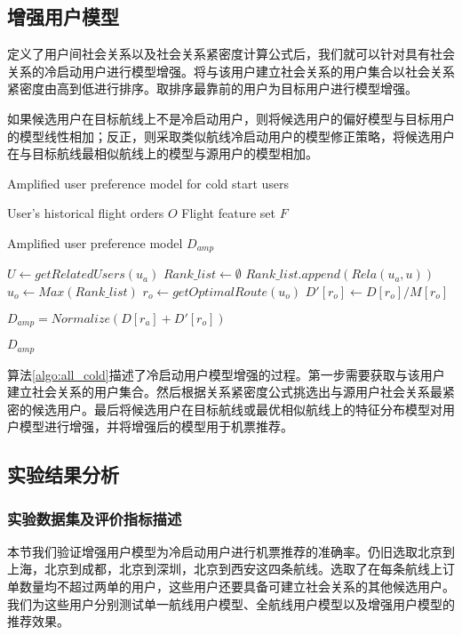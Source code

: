 \subsection{增强用户模型}

定义了用户间社会关系以及社会关系紧密度计算公式后，我们就可以针对具有社会关系的冷启动用户进行模型增强。将与该用户建立社会关系的用户集合以社会关系紧密度由高到低进行排序。取排序最靠前的用户为目标用户进行模型增强。

如果候选用户在目标航线上不是冷启动用户，则将候选用户的偏好模型与目标用户的模型线性相加；反正，则采取类似航线冷启动用户的模型修正策略，将候选用户在与目标航线最相似航线上的模型与源用户的模型相加。

\begin{algorithm}
\caption{Amplified user preference model for cold start users}
\label{algo:all_cold}
\begin{algorithmic}[1]
\Require
\Statex User's historical flight orders $O$
\Statex Flight feature set $F$

\Ensure 
\Statex Amplified user preference model $D_{amp}$

\State $U \gets getRelatedUsers(u_a)$
\State $Rank\_list \gets \emptyset$
\State $Rank\_list.append(Rela(u_a,u)) $
\EndFor
\State $u_o \gets Max(Rank\_list)$
\State $r_o \gets getOptimalRoute(u_o)$
\State $D'[r_o] \gets D[r_o] / M[r_o]$

\State $D_{amp} = Normalize(D[r_a] + D'[r_o])$

\State \Return $D_{amp}$
\end{algorithmic}
\end{algorithm}

算法\ref{algo:all_cold}描述了冷启动用户模型增强的过程。第一步需要获取与该用户建立社会关系的用户集合。然后根据关系紧密度公式挑选出与源用户社会关系最紧密的候选用户。最后将候选用户在目标航线或最优相似航线上的特征分布模型对用户模型进行增强，并将增强后的模型用于机票推荐。

\subsection{实验结果分析}

\subsubsection{实验数据集及评价指标描述}

本节我们验证增强用户模型为冷启动用户进行机票推荐的准确率。仍旧选取北京到上海，北京到成都，北京到深圳，北京到西安这四条航线。选取了在每条航线上订单数量均不超过两单的用户，这些用户还要具备可建立社会关系的其他候选用户。我们为这些用户分别测试单一航线用户模型、全航线用户模型以及增强用户模型的推荐效果。

